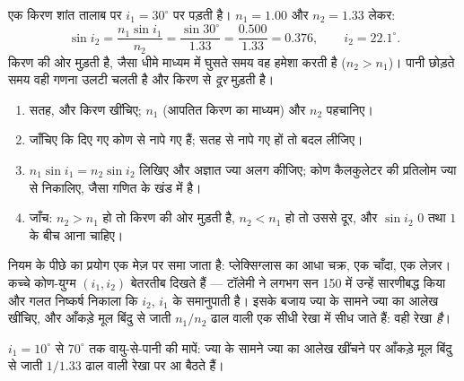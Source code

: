 \begin{example}[वायु से पानी]\label{ex:g10:refraction:airwater}
एक किरण शांत तालाब पर $i_1 = 30^\circ$ पर पड़ती है। $n_1 = 1.00$ और $n_2 = 1.33$ लेकर:
\[
\sin i_2 = \frac{n_1 \sin i_1}{n_2} = \frac{\sin 30^\circ}{1.33}
= \frac{0.500}{1.33} = 0.376,
\qquad
i_2 = 22.1^\circ .
\]
किरण  की ओर मुड़ती है, जैसा धीमे माध्यम में घुसते समय वह
हमेशा करती है ($n_2 > n_1$)। पानी छोड़ते समय वही गणना उलटी चलती है और किरण
 से \emph{दूर} मुड़ती है।
\end{example}

\begin{method}\label{met:g10:refraction:method}
\begin{enumerate}
  \item सतह,  और किरण खींचिए; $n_1$ (आपतित किरण का
        माध्यम) और $n_2$ पहचानिए।
  \item जाँचिए कि दिए गए कोण  से नापे गए हैं; सतह से नापे
        गए हों तो बदल लीजिए।
  \item $n_1 \sin i_1 = n_2 \sin i_2$ लिखिए और अज्ञात ज्या अलग कीजिए; कोण कैलकुलेटर की
        प्रतिलोम ज्या से निकालिए, जैसा गणित के खंड में है।
  \item जाँच: $n_2 > n_1$ हो तो किरण  की ओर मुड़ती है, $n_2 < n_1$
        हो तो उससे दूर, और $\sin i_2$ $0$ तथा $1$ के बीच आना चाहिए।
\end{enumerate}
\end{method}

नियम के पीछे का प्रयोग एक मेज़ पर समा जाता है: प्लेक्सिग्लास का आधा
चक्र, एक चाँदा, एक लेज़र। कच्चे कोण-युग्म $(i_1, i_2)$ बेतरतीब दिखते हैं ---
टॉलेमी ने लगभग सन 150 में उन्हें सारणीबद्ध किया और गलत निष्कर्ष निकाला
कि $i_2$, $i_1$ के समानुपाती है। इसके बजाय ज्या के सामने ज्या का
आलेख खींचिए, और आँकड़े मूल बिंदु से जाती $n_1/n_2$ ढाल वाली एक सीधी रेखा
में सीध जाते हैं: वही रेखा  \emph{है}।

\begin{omfigure}

{\small $i_1 = 10^\circ$ से $70^\circ$ तक वायु-से-पानी की मापें: ज्या के सामने ज्या
का आलेख खींचने पर आँकड़े मूल बिंदु से जाती $1/1.33$ ढाल वाली रेखा पर आ
बैठते हैं।}
\end{omfigure}

